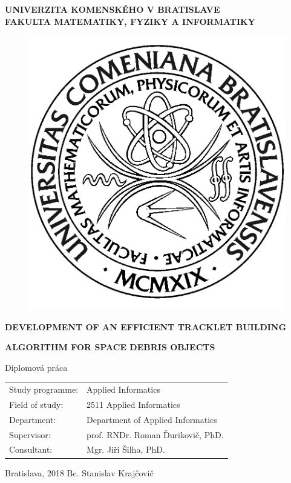 \documentclass[12pt, a4paper, oneside]{book}
\newcommand{\mfthesistype}{Diplomová práca}
\newcommand{\mfauthor}{Bc. Stanislav Krajčovič}
\newcommand{\mfadvisor}{prof. RNDr. Roman Ďurikovič, PhD.}
\newcommand{\mfplacedate}{Bratislava, 2018}
\newcommand{\mfuniversity}{UNIVERZITA KOMENSKÉHO V BRATISLAVE}
\newcommand{\mffaculty}{FAKULTA MATEMATIKY, FYZIKY A INFORMATIKY}
\begin{document}
\thispagestyle{empty}

\noindent
\begin{minipage}{\textwidth}
\begin{center}
\textbf{\mfuniversity \\
\mffaculty}
\end{center}
\end{minipage}

\vfill
\begin{figure}[!hbt]
\begin{center}
\includegraphics{images/logo_fmph}
\label{img:logo}
\end{center}
\end{figure}
\begin{center}
\begin{minipage}{0.8\textwidth}
\centerline{\textbf{\Large\MakeUppercase{Development of an efficient tracklet building }}}
\smallskip
\centerline{\textbf{\Large\MakeUppercase{algorithm for space debris objects}}}
\smallskip
\centerline{\mfthesistype}
\end{minipage}
\end{center}
\vfill
\begin{tabular}{l l}
Study programme: & Applied Informatics\\
Field of study: & 2511 Applied Informatics\\
Department: & Department of Applied Informatics\\
Supervisor: & \mfadvisor \\
Consultant: & Mgr. Jiří Šilha, PhD.
\end{tabular}
\vfill
\noindent
\mfplacedate \hfill
\mfauthor
\eject 
\end{document}
